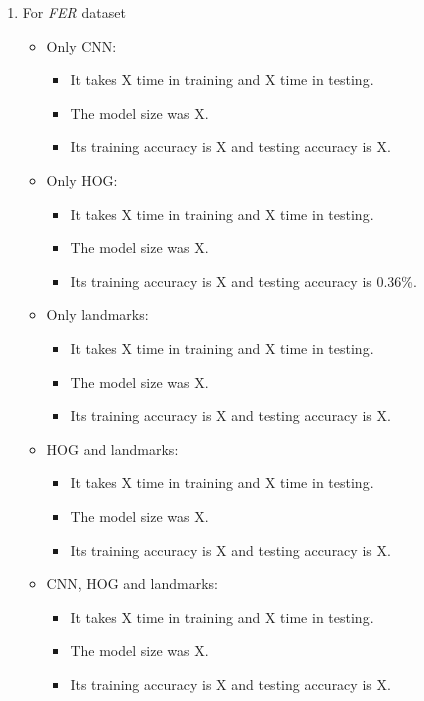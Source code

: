 \begin{enumerate}
\item For \textit{FER} dataset \newline
\begin{itemize}
    \item Only CNN: 
        \begin{itemize}
            \item It takes X time in training and X time in testing.
            \item The model size was X.
            \item Its training accuracy is X and testing accuracy is X.
        \end{itemize}
    \item Only HOG: 
        \begin{itemize}
            \item It takes X time in training and X time in testing.
            \item The model size was X.
            \item Its training accuracy is X and testing accuracy is 0.36\%.
        \end{itemize}
    \item Only landmarks: 
        \begin{itemize}
            \item It takes X time in training and X time in testing.
            \item The model size was X.
            \item Its training accuracy is X and testing accuracy is X.
        \end{itemize}
    \item HOG and landmarks: 
        \begin{itemize}
            \item It takes X time in training and X time in testing.
            \item The model size was X.
            \item Its training accuracy is X and testing accuracy is X.
        \end{itemize}
    \item CNN, HOG and landmarks: 
        \begin{itemize}
            \item It takes X time in training and X time in testing.
            \item The model size was X.
            \item Its training accuracy is X and testing accuracy is X.

\end{itemize}
\end{itemize}
\end{enumerate}
